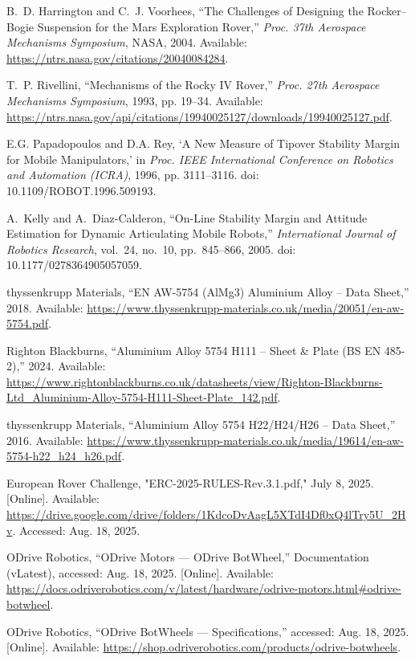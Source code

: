\documentclass[letterpaper, 10 pt, conference]{ieeeconf}  %
\begin{document}
\begin{thebibliography}{99}
B.~D. Harrington and C.~J. Voorhees,
``The Challenges of Designing the Rocker--Bogie Suspension for the Mars Exploration Rover,''
\emph{Proc. 37th Aerospace Mechanisms Symposium}, NASA, 2004.
Available: \url{https://ntrs.nasa.gov/citations/20040084284}.

T.~P. Rivellini,
``Mechanisms of the Rocky IV Rover,''
\emph{Proc. 27th Aerospace Mechanisms Symposium}, 1993, pp. 19--34.
Available: \url{https://ntrs.nasa.gov/api/citations/19940025127/downloads/19940025127.pdf}.


E.G. Papadopoulos and D.A. Rey,
`A New Measure of Tipover Stability Margin for Mobile Manipulators,'
in \emph{Proc. IEEE International Conference on Robotics and Automation (ICRA)}, 1996, pp. 3111--3116.
doi: 10.1109/ROBOT.1996.509193.

A.~Kelly and A.~Diaz-Calderon,
``On-Line Stability Margin and Attitude Estimation for Dynamic Articulating Mobile Robots,''
\emph{International Journal of Robotics Research}, vol.~24, no.~10, pp.~845--866, 2005.
doi: 10.1177/0278364905057059.

thyssenkrupp Materials,
``EN AW-5754 (AlMg3) Aluminium Alloy -- Data Sheet,'' 2018.
Available: \url{https://www.thyssenkrupp-materials.co.uk/media/20051/en-aw-5754.pdf}.

Righton Blackburns,
``Aluminium Alloy 5754 H111 -- Sheet \& Plate (BS EN 485-2),'' 2024.
Available: \url{https://www.rightonblackburns.co.uk/datasheets/view/Righton-Blackburns-Ltd_Aluminium-Alloy-5754-H111-Sheet-Plate_142.pdf}.

thyssenkrupp Materials,
``Aluminium Alloy 5754 H22/H24/H26 -- Data Sheet,'' 2016.
Available: \url{https://www.thyssenkrupp-materials.co.uk/media/19614/en-aw-5754-h22_h24_h26.pdf}.

 European Rover Challenge, "ERC-2025-RULES-Rev.3.1.pdf," July 8, 2025. [Online]. Available: \url{https://drive.google.com/drive/folders/1KdcoDvAagL5XTdI4Df0xQ4lTry5U_2Hv}. Accessed: Aug. 18, 2025.

ODrive Robotics, ``ODrive Motors — ODrive BotWheel,'' Documentation (vLatest), accessed: Aug. 18, 2025. [Online]. Available:
\url{https://docs.odriverobotics.com/v/latest/hardware/odrive-motors.html#odrive-botwheel}.

ODrive Robotics, ``ODrive BotWheels — Specifications,'' accessed: Aug. 18, 2025. [Online]. Available:
\url{https://shop.odriverobotics.com/products/odrive-botwheels}.

\end{thebibliography}
\end{document}
